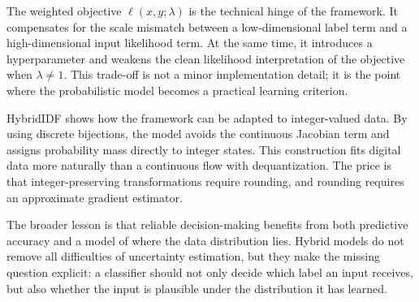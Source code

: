 \documentclass[runningheads]{llncs}
\begin{document}
The weighted objective \(\ell(x,y;\lambda)\) is the technical hinge of the
framework. It compensates for the scale mismatch between a low-dimensional label
term and a high-dimensional input likelihood term. At the same time, it
introduces a hyperparameter and weakens the clean likelihood interpretation of
the objective when \(\lambda\neq 1\). This trade-off is not a minor implementation
detail; it is the point where the probabilistic model becomes a practical
learning criterion.

HybridIDF shows how the framework can be adapted to integer-valued data. By
using discrete bijections, the model avoids the continuous Jacobian term and
assigns probability mass directly to integer states. This construction fits
digital data more naturally than a continuous flow with dequantization. The price
is that integer-preserving transformations require rounding, and rounding
requires an approximate gradient estimator.

The broader lesson is that reliable decision-making benefits from both
predictive accuracy and a model of where the data distribution lies. Hybrid
models do not remove all difficulties of uncertainty estimation, but they make
the missing question explicit: a classifier should not only decide which label an
input receives, but also whether the input is plausible under the distribution it
has learned.



\end{document}
